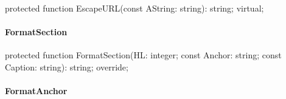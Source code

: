 \documentclass{report}
\newif\ifpdf
\begin{document}
\label{PasDoc_GenHtml.TGenericHTMLDocGenerator-EscapeURL}
\begin{list}{}{
\setlength{\itemindent}{0cm}
\setlength{\listparindent}{0cm}
\setlength{\leftmargin}{\evensidemargin}
\addtolength{\leftmargin}{\tmplength}
\settowidth{\labelsep}{X}
\addtolength{\leftmargin}{\labelsep}
\setlength{\labelwidth}{\tmplength}
}
\item[\textbf{Declaration}\hfill]
\ifpdf
\begin{flushleft}
\fi
\begin{ttfamily}
protected function EscapeURL(const AString: string): string; virtual;\end{ttfamily}

\ifpdf
\end{flushleft}
\fi

\end{list}
\paragraph*{FormatSection}\hspace*{\fill}

\label{PasDoc_GenHtml.TGenericHTMLDocGenerator-FormatSection}
\begin{list}{}{
\setlength{\itemindent}{0cm}
\setlength{\listparindent}{0cm}
\setlength{\leftmargin}{\evensidemargin}
\addtolength{\leftmargin}{\tmplength}
\settowidth{\labelsep}{X}
\addtolength{\leftmargin}{\labelsep}
\setlength{\labelwidth}{\tmplength}
}
\item[\textbf{Declaration}\hfill]
\ifpdf
\begin{flushleft}
\fi
\begin{ttfamily}
protected function FormatSection(HL: integer; const Anchor: string; const Caption: string): string; override;\end{ttfamily}

\ifpdf
\end{flushleft}
\fi

\end{list}
\paragraph*{FormatAnchor}\hspace*{\fill}
\end{document}
